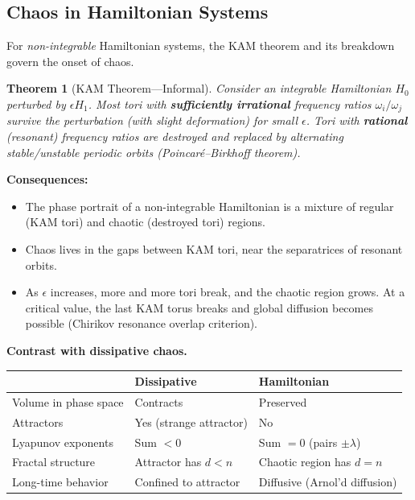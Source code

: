 \documentclass[11pt,letterpaper]{article}
\theoremstyle{definition}
\theoremstyle{plain}
\newtheorem{theorem}{Theorem}[section]
\theoremstyle{remark}
\begin{document}
\subsection{Chaos in Hamiltonian Systems}

For \emph{non-integrable} Hamiltonian systems, the KAM theorem and
its breakdown govern the onset of chaos.

\begin{theorem}[KAM Theorem---Informal]
Consider an integrable Hamiltonian $H_0$ perturbed by $\epsilon H_1$.
Most tori with \textbf{sufficiently irrational} frequency ratios
$\omega_i/\omega_j$ survive the perturbation (with slight deformation)
for small $\epsilon$.  Tori with \textbf{rational} (resonant) frequency
ratios are destroyed and replaced by alternating stable/unstable
periodic orbits (Poincar\'e--Birkhoff theorem).
\end{theorem}

\textbf{Consequences:}
\begin{itemize}[leftmargin=2em]
  \item The phase portrait of a non-integrable Hamiltonian is a mixture
    of regular (KAM tori) and chaotic (destroyed tori) regions.
  \item Chaos lives in the gaps between KAM tori, near the separatrices
    of resonant orbits.
  \item As $\epsilon$ increases, more and more tori break, and the
    chaotic region grows.  At a critical value, the last KAM torus
    breaks and global diffusion becomes possible
    (Chirikov resonance overlap criterion).
\end{itemize}

\textbf{Contrast with dissipative chaos.}
\begin{center}
\renewcommand{\arraystretch}{1.3}
\begin{tabular}{@{}lll@{}}
\toprule
& \textbf{Dissipative} & \textbf{Hamiltonian} \\
\midrule
Volume in phase space & Contracts & Preserved \\
Attractors & Yes (strange attractor) & No \\
Lyapunov exponents & Sum $<0$ & Sum $=0$ (pairs $\pm\lambda$) \\
Fractal structure & Attractor has $d<n$ & Chaotic region has $d=n$ \\
Long-time behavior & Confined to attractor & Diffusive (Arnol'd diffusion) \\
\bottomrule
\end{tabular}
\end{center}
\end{document}
